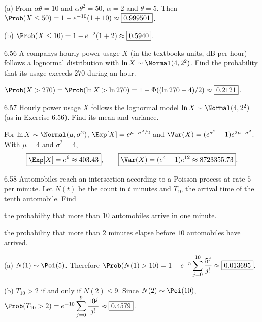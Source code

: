 \documentclass[11pt,oneside]{article}
\begin{document}
\begin{solution}
\noindent\textup{(a)} From $\alpha\theta=10$ and $\alpha\theta^2=50$, $\alpha=2$ and $\theta=5$. Then $\Prob(X\le50)=1-e^{-10}(1+10)\approx\boxed{0.999501}$.

\noindent\textup{(b)} $\Prob(X\le10)=1-e^{-2}(1+2)\approx\boxed{0.5940}$.
\end{solution}

\begin{exercise}{6.56}
A company\textquotesingle s hourly power usage $X$ (in the textbook\textquotesingle s units, dB per hour) follows a lognormal distribution with $\ln X\sim\Normal(4,2^2)$. Find the probability that its usage exceeds $270$ during an hour.
\end{exercise}

\begin{solution}
$\Prob(X>270)=\Prob(\ln X>\ln270)=1-\Phi((\ln270-4)/2)\approx\boxed{0.2121}$.
\end{solution}

\begin{exercise}{6.57}
Hourly power usage $X$ follows the lognormal model $\ln X\sim\Normal(4,2^2)$ (as in Exercise 6.56). Find its mean and variance.
\end{exercise}

\begin{solution}
For $\ln X\sim\Normal(\mu,\sigma^2)$, $\Exp[X]=e^{\mu+\sigma^2/2}$ and $\Var(X)=(e^{\sigma^2}-1)e^{2\mu+\sigma^2}$. With $\mu=4$ and $\sigma^2=4$,
\[
\boxed{\Exp[X]=e^6\approx403.43},\qquad
\boxed{\Var(X)=(e^4-1)e^{12}\approx8723355.73}.
\]
\end{solution}

\begin{exercise}{6.58}
Automobiles reach an intersection according to a Poisson process at rate $5$ per minute. Let $N(t)$ be the count in $t$ minutes and $T_{10}$ the arrival time of the tenth automobile. Find
\begin{exercisesubparts}
\item the probability that more than $10$ automobiles arrive in one minute.
\item the probability that more than $2$ minutes elapse before $10$ automobiles have arrived.
\end{exercisesubparts}
\end{exercise}

\begin{solution}
\noindent\textup{(a)} $N(1)\sim\Poi(5)$. Therefore $\Prob(N(1)>10)=1-e^{-5}\displaystyle\sum_{j=0}^{10}\frac{5^j}{j!}\approx\boxed{0.013695}$.

\noindent\textup{(b)} $T_{10}>2$ if and only if $N(2)\le9$. Since $N(2)\sim\Poi(10)$, $\Prob(T_{10}>2)=e^{-10}\displaystyle\sum_{j=0}^9\frac{10^j}{j!}\approx\boxed{0.4579}$.
\end{solution}
\end{document}
